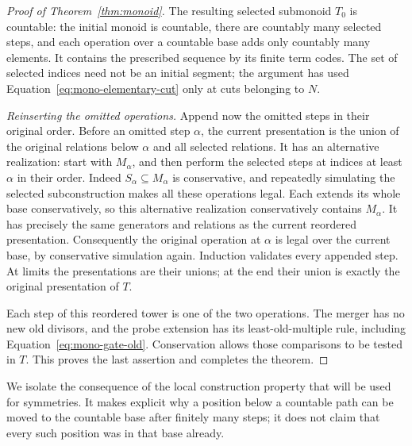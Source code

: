 \begin{proof}[Proof of Theorem~\ref{thm:monoid}]
The resulting selected submonoid $T_0$ is countable: the initial
monoid is countable, there are countably many selected steps, and each
operation over a countable base adds only countably many elements.
It contains the prescribed sequence by its finite term codes.
The set of selected indices need not be an initial segment; the
argument has used Equation~\eqref{eq:mono-elementary-cut} only at
cuts belonging to $N$.

\smallskip\noindent\textit{Reinserting the omitted operations.}
Append now the omitted steps in their original order.  Before an
omitted step $\alpha$, the current presentation is the union of the
original relations below $\alpha$ and all selected relations.  It has
an alternative realization: start with $M_\alpha$, and then perform
the selected steps at indices at least $\alpha$ in their order.
Indeed $S_\alpha\subseteq M_\alpha$ is conservative, and repeatedly
simulating the selected subconstruction makes all these operations
legal.  Each extends its whole base conservatively, so this alternative
realization conservatively contains $M_\alpha$.  It has precisely
the same generators and relations as the current reordered
presentation.  Consequently the original operation at $\alpha$ is
legal over the current base, by conservative simulation again.
Induction validates every appended step.  At limits the presentations
are their unions; at the end their union is exactly the original
presentation of $T$.

Each step of this reordered tower is one of the two operations.
The merger has no new old divisors, and the probe extension has its
least-old-multiple rule, including
Equation~\eqref{eq:mono-gate-old}.  Conservation allows those
comparisons to be tested in $T$.  This proves the last assertion and
completes the theorem.
\end{proof}

We isolate the consequence of the local construction property that will
be used for symmetries.  It makes explicit why a position below a
countable path can be moved to the countable base after finitely many
steps; it does not claim that every such position was in that base
already.

